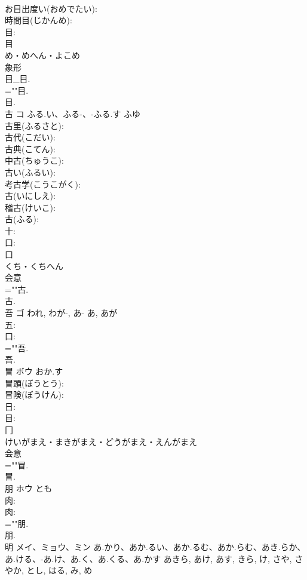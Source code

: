 \documentclass[8pt]{extreport}
\begin{document}
\begin{CJK}{UTF8}{min}
\\	お目出度い(おめでたい): 
\\	時間目(じかんめ): 
\\	目: 
\\	目	
\\	め・めへん・よこめ	
\\	象形 
\\	目_目.	
\\	=""目.
\\	目.
\\	古	コ	ふる.い、ふる-、-ふる.す	ふゆ	
\\	古里(ふるさと): 
\\	古代(こだい): 
\\	古典(こてん): 
\\	中古(ちゅうこ): 
\\	古い(ふるい): 
\\	考古学(こうこがく): 
\\	古(いにしえ): 
\\	稽古(けいこ): 
\\	古(ふる): 
\\	十: 
\\	口: 
\\	口	
\\	くち・くちへん	
\\	会意 
\\	=""古.
\\	古.
\\	吾	ゴ	われ, わが-, あ-	あ, あが	
\\	五: 
\\	口: 
\\	=""吾.
\\	吾.
\\	冒	ボウ	おか.す		
\\	冒頭(ぼうとう): 
\\	冒険(ぼうけん): 
\\	日: 
\\	目: 
\\	冂	
\\	けいがまえ・まきがまえ・どうがまえ・えんがまえ	
\\	会意 
\\	=""冒.
\\	冒.
\\	朋	ホウ	とも		
\\	肉: 
\\	肉: 
\\	=""朋.
\\	朋.
\\	明	メイ、ミョウ、ミン	あ.かり、あか.るい、あか.るむ、あか.らむ、あき.らか、あ.ける、-あ.け、あ.く、あ.くる、あ.かす	あきら, あけ, あす, きら, け, さや, さやか, とし, はる, み, め	

\end{CJK}
\end{document}
